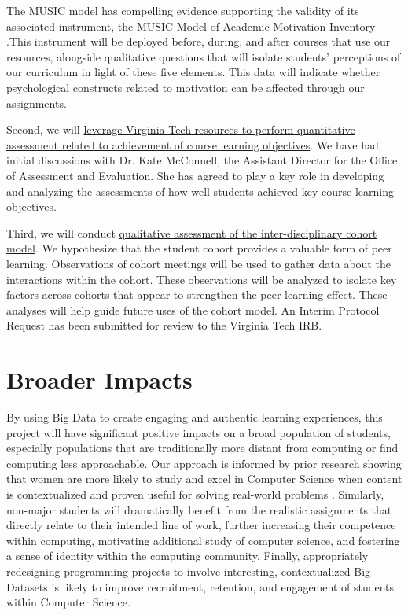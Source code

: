 \documentclass[11pt]{article}
\begin{document}
The MUSIC model has compelling evidence supporting the validity of its associated instrument, the MUSIC Model of Academic Motivation Inventory \cite{jones-validity}.This instrument will be deployed before, during, and after courses that use our resources, alongside qualitative questions that will isolate students' perceptions of our curriculum in light of these five elements.
This data will indicate whether psychological constructs related to motivation can be affected through our assignments.

Second, we will \uline{leverage Virginia Tech resources to perform quantitative assessment related to achievement of course learning objectives}. We have had initial discussions with Dr. Kate McConnell, the Assistant Director for the Office of Assessment and Evaluation. She has agreed to play a key role in developing and analyzing the assessments of how well students achieved key course learning objectives.

Third, we will conduct \uline{qualitative assessment of the inter-disciplinary cohort model}. We hypothesize that the student cohort provides a valuable form of peer learning. Observations of cohort meetings will be used to gather data about the interactions within the cohort. These observations will be analyzed to isolate key factors across cohorts that appear to strengthen the peer learning effect. These analyses will help guide future uses of the cohort model. An Interim Protocol Request has been submitted for review to the Virginia Tech IRB.

\section{Broader Impacts}
By using Big Data to create engaging and authentic learning experiences, this project will have significant positive impacts on a broad population of students, especially populations that are traditionally more distant from computing or find computing less approachable.
Our approach is informed by prior research showing that women are more likely to study and excel in Computer Science when content is contextualized and proven useful for solving real-world problems \cite{Fisher, Carter2006}. 
Similarly, non-major students will dramatically benefit from the realistic assignments that directly relate to their intended line of work, further increasing their competence within computing, motivating additional study of computer science, and fostering a sense of identity within the computing community.
Finally, appropriately redesigning programming projects to involve interesting, contextualized Big Datasets is likely to improve recruitment, retention, and engagement of students within Computer Science.
\end{document}
